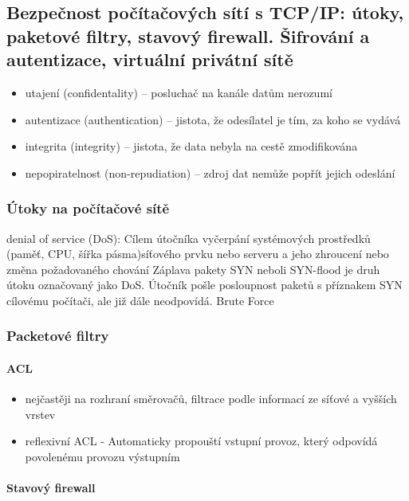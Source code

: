 \documentclass[10pt,a4paper]{article}
\begin{document}
\subsection{Bezpečnost počítačových sítí s TCP/IP: útoky, paketové filtry, stavový firewall. Šifrování a autentizace, virtuální privátní sítě}
\begin{itemize}
\item utajení (confidentality) – posluchač na kanále datům nerozumí
\item autentizace (authentication) – jistota, že odesílatel je tím, za koho se vydává
\item integrita (integrity) – jistota, že data nebyla na cestě zmodifikována
\item nepopiratelnost (non-repudiation) – zdroj dat nemůže popřít jejich odeslání
\end{itemize}

\subsubsection{Útoky na počítačové sítě}
denial of service (DoS): Cílem útočníka vyčerpání systémových prostředků (paměť, CPU, šířka pásma)síťového prvku nebo serveru a jeho zhroucení nebo změna požadovaného chování Záplava pakety SYN neboli SYN-flood je druh útoku označovaný jako DoS. Útočník pošle posloupnost paketů s příznakem SYN cílovému počítači, ale již dále neodpovídá. Brute Force
\subsubsection{Packetové filtry}
\paragraph{ACL}

\begin{itemize}
\item nejčastěji na rozhraní směrovačů, filtrace podle informací ze síťové a vyšších vrstev
\item reflexivní ACL - Automaticky propouští vstupní provoz, který odpovídá povolenému provozu výstupním
\end{itemize}
\paragraph{Stavový firewall}
\end{document}
